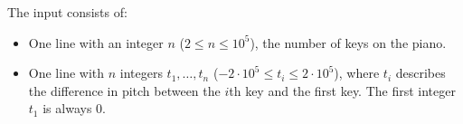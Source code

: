 
  The input consists of:
  \begin{itemize}
    \item One line with an integer $n$ ($2 \leq n \leq 10^5$), the number of keys on the piano. 
    \item One line with $n$ integers $t_1,\dots,t_n$ ($-2 \cdot 10^5 \leq t_i \leq 2 \cdot 10^5$), where $t_i$ describes the difference in pitch between the $i$th key and the first key.     
      The first integer $t_1$ is always $0$.    
  \end{itemize}
